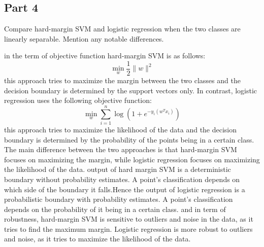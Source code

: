 \subsection{Part 4}
Compare hard-margin SVM and logistic regression when the two classes are linearly separable. Mention any notable differences.
\begin{qsolve}
	\begin{qsolve}[]
		in the term of objective function hard-margin SVM is as follows:
		\[
		\min_{w} \frac{1}{2} \|w\|^2
		\]
		this approach tries to maximize the margin between the two classes and the decision boundary is determined by the support vectors only. In contrast, logistic regression uses the following objective function:
		\[
		\min_{w} \sum_{i=1}^{n} \log(1 + e^{-y_i(w^T x_i)})
		\]
		this approach tries to maximize the likelihood of the data and the decision boundary is determined by the probability of the points being in a certain class. The main difference between the two approaches is that hard-margin SVM focuses on maximizing the margin, while logistic regression focuses on maximizing the likelihood of the data. 
		output of hard margin SVM is a deterministic boundary without probability estimates. A point's classification depends on which side of the boundary it falls.Hence the output of logistic regression is a probabilistic boundary with probability estimates. A point's classification depends on the probability of it being in a certain class.
		and in term of robustness, hard-margin SVM is sensitive to outliers and noise in the data, as it tries to find the maximum margin. Logistic regression is more robust to outliers and noise, as it tries to maximize the likelihood of the data.
	\end{qsolve}
\end{qsolve}
